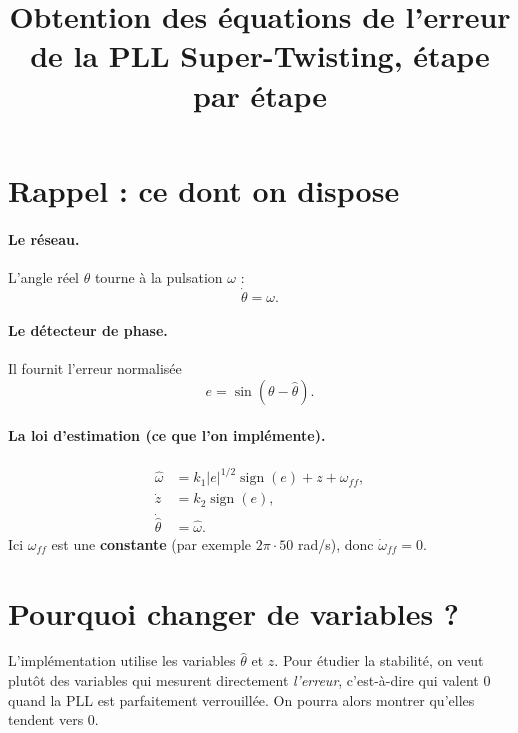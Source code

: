\documentclass[11pt,a4paper]{article}
\title{Obtention des équations de l'erreur\\ de la PLL Super-Twisting, étape par étape}
\date{}
\newcommand{\sign}{\operatorname{sign}}
\newcommand{\hth}{\hat{\theta}}
\newcommand{\hw}{\hat{\omega}}
\begin{document}
\maketitle

\section{Rappel : ce dont on dispose}

\paragraph{Le réseau.} L'angle réel $\theta$ tourne à la pulsation $\omega$ :
\begin{equation}
\dot\theta = \omega .
\end{equation}

\paragraph{Le détecteur de phase.} Il fournit l'erreur normalisée
\begin{equation}
e = \sin(\theta - \hth) .
\end{equation}

\paragraph{La loi d'estimation (ce que l'on implémente).}
\begin{align}
\hw &= k_1 |e|^{1/2}\sign(e) + z + \omega_{ff}, \label{eq:loi}\\
\dot z &= k_2 \sign(e), \label{eq:z}\\
\dot{\hth} &= \hw . \label{eq:int}
\end{align}
Ici $\omega_{ff}$ est une \textbf{constante} (par exemple $2\pi\cdot 50$ rad/s), donc $\dot\omega_{ff}=0$.

\section{Pourquoi changer de variables ?}

\begin{idee}
L'implémentation utilise les variables $\hth$ et $z$. Pour étudier la stabilité, on veut
plutôt des variables qui mesurent directement \emph{l'erreur}, c'est-à-dire qui valent $0$
quand la PLL est parfaitement verrouillée. On pourra alors montrer qu'elles tendent vers $0$.
\end{idee}
\end{document}
